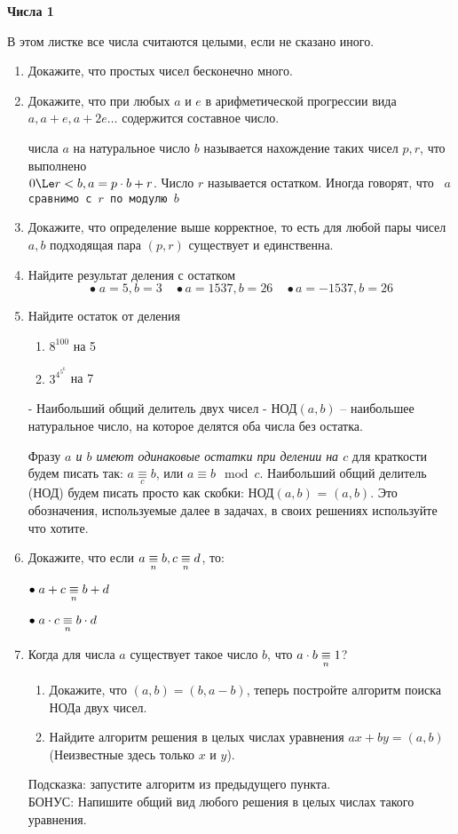 \centerline{\bf \large Числа 1}
В этом листке все числа считаются целыми, если не сказано иного.
\begin{enumerate}
 -- число, у которого ровно два натуральных делителя - 1 и оно само.
\item Докажите, что простых чисел бесконечно много.
\item Докажите, что при любых $a$ и $e$ в арифметической прогрессии вида $a, a + e, a + 2e \ldots$
содержится составное число.

 числа $a$ на натуральное число $b$ называется нахождение таких чисел $p, r$, что
выполнено \\ $0 \Le r < b, a = p \cdot b + r$. Число $r$ называется остатком. Иногда говорят, что {\tt
$a$ сравнимо с $r$ по модулю $b$}
\item Докажите, что определение выше корректное, то есть для любой пары чисел $a, b$ подходящая пара
$(p, r)$ существует и единственна.
\item Найдите результат деления с остатком
\begin{equation*}
\bullet \; a = 5, b = 3 \quad \bullet a = 1537, b = 26 \quad \bullet a = -1537, b = 26
\end{equation*}
\item Найдите остаток от деления
\begin{enumerate}[noitemsep]
\item $8^{100}$ на 5
\item $3^{4^{5^{6}}}$ на 7
\end{enumerate}
 - Наибольший общий делитель двух чисел - НОД$(a, b)$ -- наибольшее
натуральное число, на которое делятся оба числа без остатка.

Фразу {\it$a$ и $b$ имеют одинаковые остатки при делении на $c$} для краткости будем писать так: $a
\underset{c}{\equiv} b $, или $a \equiv b \mod c$. Наибольший общий делитель (НОД) будем писать просто как скобки: НОД$(a, b)$ = $(a, b)$.
Это обозначения, используемые далее в задачах, в своих решениях используйте что хотите.
\item Докажите, что если $a \underset{n}{\equiv} b, c \underset{n}{\equiv} d$, то:

$\bullet \;a + c \underset{n}{\equiv} b + d$

$\bullet \;a \cdot c \underset{n}{\equiv} b \cdot d$
\item Когда для числа $a$ существует такое число $b$, что $a \cdot b \underset{n}{\equiv} 1$?
\begin{enumerate}[noitemsep]
\item Докажите, что $(a, b) = (b, a - b)$, теперь постройте алгоритм поиска НОДа двух чисел.
\item Найдите алгоритм решения в целых числах уравнения $ax + by = (a, b)$
\\(Неизвестные здесь только $x$ и $y$).\\
\end{enumerate}
{\color{DarkGray}Подсказка: запустите алгоритм из предыдущего пункта.}\\
БОНУС: Напишите общий вид любого решения в целых числах такого уравнения.


\end{enumerate}
